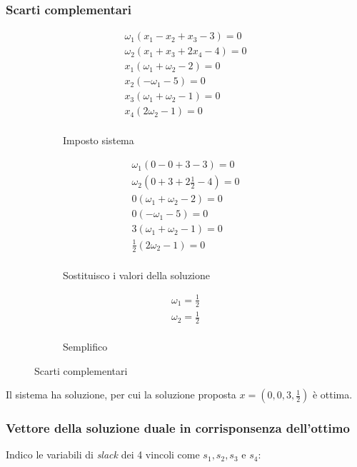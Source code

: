\documentclass[\main/main.tex]{subfiles}
\begin{document}
\subsubsection*{Scarti complementari}
\begin{figure}
  \begin{subfigure}{0.31\textwidth}
    \begin{align*}
      \omega_1(x_1 - x_2 + x_3 - 3) = 0 \\
      \omega_2(x_1 + x_3 + 2x_4 -4) = 0 \\
      x_1(\omega_1 + \omega_2 -2) = 0   \\
      x_2(-\omega_1-5)=0                \\
      x_3(\omega_1 + \omega_2-1)=0      \\
      x_4(2\omega_2-1)=0                \\
    \end{align*}
    \caption{Imposto sistema}
  \end{subfigure}
  \begin{subfigure}{0.31\textwidth}
    \begin{align*}
      \omega_1(0 - 0 + 3 - 3) = 0           \\
      \omega_2(0 + 3 + 2\frac{1}{2} -4) = 0 \\
      0(\omega_1 + \omega_2 -2) = 0         \\
      0(-\omega_1-5)=0                      \\
      3(\omega_1 + \omega_2-1)=0            \\
      \frac{1}{2}(2\omega_2-1)=0            \\
    \end{align*}
    \caption{Sostituisco i valori della soluzione}
  \end{subfigure}
  \begin{subfigure}{0.31\textwidth}
    \begin{align*}
      \omega_1=\frac{1}{2} \\
      \omega_2=\frac{1}{2} \\
    \end{align*}
    \caption{Semplifico}
  \end{subfigure}
  \caption{Scarti complementari}
\end{figure}

Il sistema ha soluzione, per cui la soluzione proposta $x=(0,0,3,\frac{1}{2})$ è ottima.

\subsubsection*{Vettore della soluzione duale in corrisponsenza dell'ottimo}
Indico le variabili di \textit{slack} dei 4 vincoli come $s_1, s_2, s_3$ e $s_4$:
\end{document}
